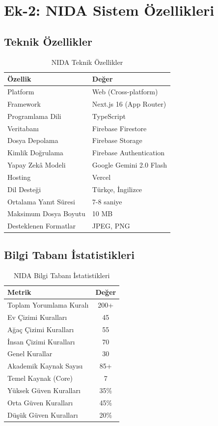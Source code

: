 \section{Ek-2: NIDA Sistem Özellikleri}

\subsection{Teknik Özellikler}

\begin{table}[H]
\centering
\caption{NIDA Teknik Özellikler}
\begin{tabular}{p{4cm}p{9cm}}
\toprule
\textbf{Özellik} & \textbf{Değer} \\
\midrule
Platform & Web (Cross-platform) \\
Framework & Next.js 16 (App Router) \\
Programlama Dili & TypeScript \\
Veritabanı & Firebase Firestore \\
Dosya Depolama & Firebase Storage \\
Kimlik Doğrulama & Firebase Authentication \\
Yapay Zekâ Modeli & Google Gemini 2.0 Flash \\
Hosting & Vercel \\
Dil Desteği & Türkçe, İngilizce \\
Ortalama Yanıt Süresi & 7-8 saniye \\
Maksimum Dosya Boyutu & 10 MB \\
Desteklenen Formatlar & JPEG, PNG \\
\bottomrule
\end{tabular}
\end{table}

\subsection{Bilgi Tabanı İstatistikleri}

\begin{table}[H]
\centering
\caption{NIDA Bilgi Tabanı İstatistikleri}
\begin{tabular}{p{5cm}c}
\toprule
\textbf{Metrik} & \textbf{Değer} \\
\midrule
Toplam Yorumlama Kuralı & 200+ \\
Ev Çizimi Kuralları & 45 \\
Ağaç Çizimi Kuralları & 55 \\
İnsan Çizimi Kuralları & 70 \\
Genel Kurallar & 30 \\
Akademik Kaynak Sayısı & 85+ \\
Temel Kaynak (Core) & 7 \\
Yüksek Güven Kuralları & 35\% \\
Orta Güven Kuralları & 45\% \\
Düşük Güven Kuralları & 20\% \\
\bottomrule
\end{tabular}
\end{table}

